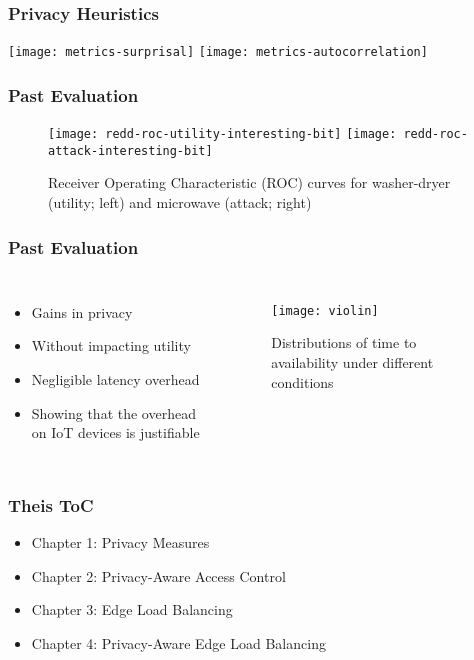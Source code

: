 \documentclass[aspectratio=169]{beamer}
\begin{document}
\begin{frame}
	\frametitle{Privacy Heuristics}
	\texttt{[image: metrics-surprisal]}
	\texttt{[image: metrics-autocorrelation]}
\end{frame}

\begin{frame}
	\frametitle{Past Evaluation}
	\begin{figure}
		\centering
		\texttt{[image: redd-roc-utility-interesting-bit]}
		\texttt{[image: redd-roc-attack-interesting-bit]}
		\caption{Receiver Operating Characteristic (ROC) curves for washer-dryer (utility; left) and microwave (attack; right)}\label{fig:redd-roc-interesting-bit}
	\end{figure}
\end{frame}

\begin{frame}
	\frametitle{Past Evaluation}
	\begin{columns}[c]

		\begin{itemize}
			\item Gains in privacy
			\item Without impacting utility
			\item Negligible latency overhead
			\item Showing that the overhead on IoT devices is justifiable
		\end{itemize}

		\begin{figure}
			\centering
			\texttt{[image: violin]}
			\caption{Distributions of time to availability under different conditions}\label{fig:violin}
		\end{figure}

	\end{columns}
\end{frame}

\begin{frame}
	\frametitle{Theis ToC}
	\begin{itemize}
		\item Chapter 1: Privacy Measures
		\item Chapter 2: Privacy-Aware Access Control
		\item Chapter 3: Edge Load Balancing
		\item Chapter 4: Privacy-Aware Edge Load Balancing
	\end{itemize}
\end{frame}
\end{document}
